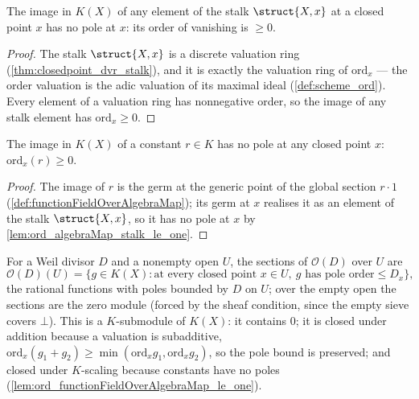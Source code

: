 \begin{lemma}
  \label{lem:ord_algebraMap_stalk_le_one}
  \leanok
  The image in \(K(X)\) of any element of the stalk \(\struct{X,x}\) at a closed point \(x\) has no
  pole at \(x\): its order of vanishing is \(\ge 0\).
\end{lemma}
\begin{proof}
  \leanok
  The stalk \(\struct{X,x}\) is a discrete valuation ring (\ref{thm:closedpoint_dvr_stalk}), and it
  is exactly the valuation ring of \(\mathrm{ord}_x\) --- the order valuation is the adic valuation
  of its maximal ideal (\ref{def:scheme_ord}). Every element of a valuation ring has nonnegative
  order, so the image of any stalk element has \(\mathrm{ord}_x \ge 0\).
\end{proof}

\begin{lemma}
  \label{lem:ord_functionFieldOverAlgebraMap_le_one}
  \leanok
  The image in \(K(X)\) of a constant \(r \in K\) has no pole at any closed point \(x\):
  \(\mathrm{ord}_x(r) \ge 0\).
\end{lemma}
\begin{proof}
  \leanok
  The image of \(r\) is the germ at the generic point of the global section \(r \cdot 1\)
  (\ref{def:functionFieldOverAlgebraMap}); its germ at \(x\) realises it as an element of the stalk
  \(\struct{X,x}\), so it has no pole at \(x\) by \ref{lem:ord_algebraMap_stalk_le_one}.
\end{proof}

\begin{definition}
  \label{def:divisorSections}
  \leanok
  For a Weil divisor \(D\) and a nonempty open \(U\), the sections of \(\mathcal O(D)\) over \(U\)
  are
  \[
    \mathcal O(D)(U) = \{ g \in K(X) : \text{at every closed point } x \in U,\ g \text{ has pole
      order} \le D_x \},
  \]
  the rational functions with poles bounded by \(D\) on \(U\); over the empty open the sections are
  the zero module (forced by the sheaf condition, since the empty sieve covers \(\bot\)). This is a
  \(K\)-submodule of \(K(X)\): it contains \(0\); it is closed under addition because a valuation is
  subadditive, \(\mathrm{ord}_x(g_1 + g_2) \ge \min(\mathrm{ord}_x g_1, \mathrm{ord}_x g_2)\), so
  the pole bound is preserved; and closed under \(K\)-scaling because constants have no poles
  (\ref{lem:ord_functionFieldOverAlgebraMap_le_one}).
\end{definition}

